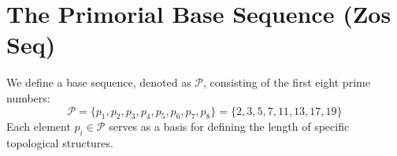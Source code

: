 \section{The Primorial Base Sequence (Zos Seq)}
We define a base sequence, denoted as $\mathcal{P}$, consisting of the first eight prime numbers:
\[ \mathcal{P} = \{p_1, p_2, p_3, p_4, p_5, p_6, p_7, p_8\} = \{2, 3, 5, 7, 11, 13, 17, 19\} \]
Each element $p_i \in \mathcal{P}$ serves as a basis for defining the length of specific topological structures.